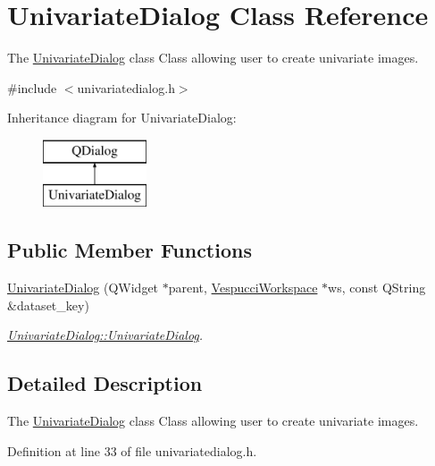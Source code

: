 \hypertarget{class_univariate_dialog}{}\section{Univariate\+Dialog Class Reference}
\label{class_univariate_dialog}


The \hyperlink{class_univariate_dialog}{Univariate\+Dialog} class Class allowing user to create univariate images.  




{\ttfamily \#include $<$univariatedialog.\+h$>$}

Inheritance diagram for Univariate\+Dialog\+:\begin{figure}[H]
\begin{center}
\leavevmode
\includegraphics[height=2.000000cm]{class_univariate_dialog}
\end{center}
\end{figure}
\subsection*{Public Member Functions}
\begin{DoxyCompactItemize}
\item 
\hyperlink{class_univariate_dialog_a65bd05261153ead899bf34da8e2cf0ca}{Univariate\+Dialog} (Q\+Widget $\ast$parent, \hyperlink{class_vespucci_workspace}{Vespucci\+Workspace} $\ast$ws, const Q\+String \&dataset\+\_\+key)
\begin{DoxyCompactList}\small\item\em \hyperlink{class_univariate_dialog_a65bd05261153ead899bf34da8e2cf0ca}{Univariate\+Dialog\+::\+Univariate\+Dialog}. \end{DoxyCompactList}\end{DoxyCompactItemize}


\subsection{Detailed Description}
The \hyperlink{class_univariate_dialog}{Univariate\+Dialog} class Class allowing user to create univariate images. 

Definition at line 33 of file univariatedialog.\+h.



